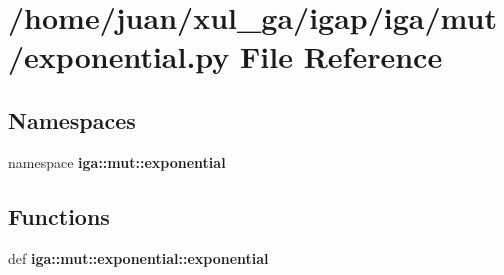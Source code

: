 \section{/home/juan/xul\_\-ga/igap/iga/mut/exponential.py File Reference}
\label{exponential_8py}
\subsection*{Namespaces}
\begin{CompactItemize}
\item 
namespace {\bf iga::mut::exponential}
\end{CompactItemize}
\subsection*{Functions}
\begin{CompactItemize}
\item 
def {\bf iga::mut::exponential::exponential}
\end{CompactItemize}
